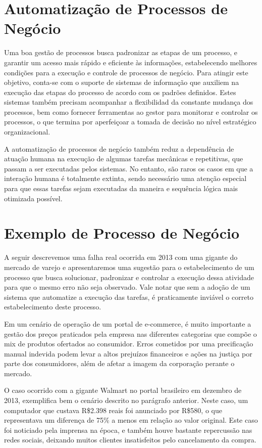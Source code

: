 \section{Automatização de Processos de Negócio}\label{sec:introducao-automatizacao}

Uma boa gestão de processos busca padronizar as etapas de um processo, e garantir um acesso mais rápido e eficiente às informações, estabelecendo melhores condições para a execução e controle de processos de negócio. Para atingir este objetivo, conta-se com o suporte de sistemas de informação que auxiliem na execução das etapas do processo de acordo com os padrões definidos. Estes sistemas também precisam acompanhar a flexibilidad da constante mudança dos processos, bem como fornecer ferramentas ao gestor para monitorar e controlar os processos, o que termina por aperfeiçoar a tomada de decisão no nível estratégico organizacional.

A automatização de processos de negócio também reduz a dependência de atuação humana na execução de algumas tarefas mecânicas e repetitivas, que passam a ser executadas pelos sistemas. No entanto, são raros os casos em que a interação humana é totalmente extinta, sendo necessário uma atenção especial para que essas tarefas sejam executadas da maneira e sequência lógica mais otimizada possível.

\section{Exemplo de Processo de Negócio}\label{sec:introducao-caso_real}

A seguir descrevemos uma falha real ocorrida em 2013 com uma gigante do mercado de varejo e apresentaremos uma sugestão para o estabelecimento de um processo que busca solucionar, padronizar e controlar a execução dessa atividade para que o mesmo erro não seja observado. Vale notar que sem a adoção de um sistema que automatize a execução das tarefas, é praticamente inviável o correto estabelecimento deste processo.

Em um cenário de operação de um portal de e-commerce, é muito importante a gestão dos preços praticados pela empresa nas diferentes categorias que compõe o mix de produtos ofertados ao consumidor. Erros cometidos por uma precificação manual indevida podem levar a altos prejuízos financeiros e ações na justiça por parte dos consumidores, além de afetar a imagem da corporação perante o mercado. 

O caso ocorrido com a gigante Walmart no portal brasileiro em dezembro de 2013, exemplifica bem o cenário descrito no parágrafo anterior. Neste caso, um computador que custava R\$2.398 reais foi anunciado por R\$580, o que representava um diferença de 75\% a menos em relação ao valor original. Este caso foi noticiado pela imprensa na época, e também houve bastante repercussão nas redes sociais, deixando muitos clientes insatisfeitos pelo cancelamento da compra\cite{noticia_erro_walmart}. 

